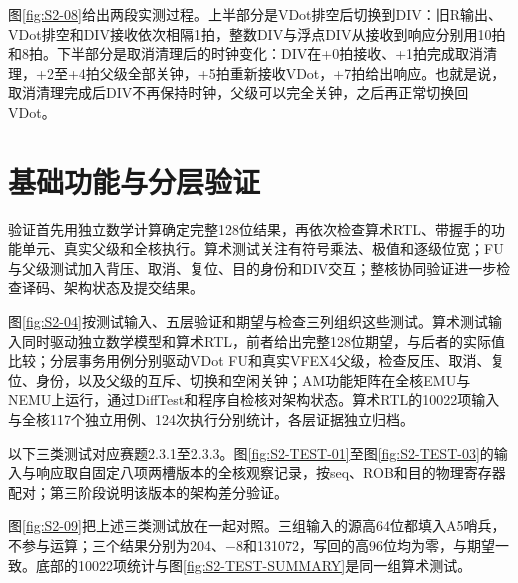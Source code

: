 图\ref{fig:S2-08}给出两段实测过程。上半部分是VDot排空后切换到DIV：旧R输出、VDot排空和DIV接收依次相隔1拍，整数DIV与浮点DIV从接收到响应分别用10拍和8拍。下半部分是取消清理后的时钟变化：DIV在+0拍接收、+1拍完成取消清理，+2至+4拍父级全部关钟，+5拍重新接收VDot，+7拍给出响应。也就是说，取消清理完成后DIV不再保持时钟，父级可以完全关钟，之后再正常切换回VDot。


\section{基础功能与分层验证}\label{sec:2-verify}
验证首先用独立数学计算确定完整128位结果，再依次检查算术RTL、带握手的功能单元、真实父级和全核执行。算术测试关注有符号乘法、极值和逐级位宽；FU与父级测试加入背压、取消、复位、目的身份和DIV交互；整核协同验证进一步检查译码、架构状态及提交结果。

图\ref{fig:S2-04}按测试输入、五层验证和期望与检查三列组织这些测试。算术测试输入同时驱动独立数学模型和算术RTL，前者给出完整128位期望，与后者的实际值比较；分层事务用例分别驱动VDot FU和真实VFEX4父级，检查反压、取消、复位、身份，以及父级的互斥、切换和空闲关钟；AM功能矩阵在全核EMU与NEMU上运行，通过DiffTest和程序自检核对架构状态。算术RTL的10022项输入与全核117个独立用例、124次执行分别统计，各层证据独立归档。


以下三类测试对应赛题2.3.1至2.3.3。图\ref{fig:S2-TEST-01}至图\ref{fig:S2-TEST-03}的输入与响应取自固定八项两槽版本的全核观察记录，按seq、ROB和目的物理寄存器配对；第三阶段说明该版本的架构差分验证。


图\ref{fig:S2-09}把上述三类测试放在一起对照。三组输入的源高64位都填入A5哨兵，不参与运算；三个结果分别为204、$-8$和131072，写回的高96位均为零，与期望一致。底部的10022项统计与图\ref{fig:S2-TEST-SUMMARY}是同一组算术测试。



